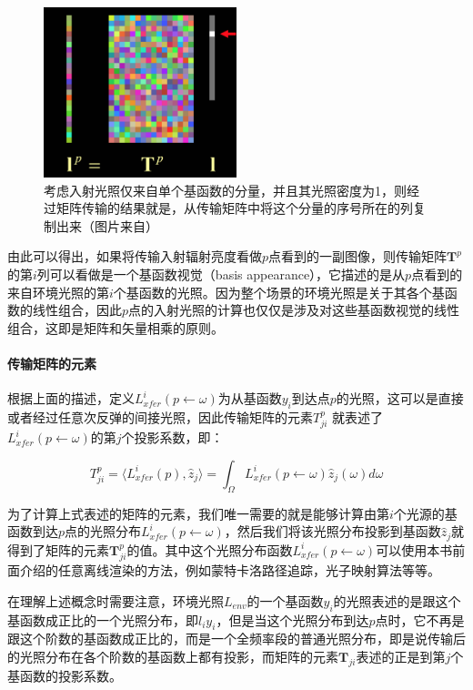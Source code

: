 \begin{figure}
\sidecaption
	\includegraphics[width=0.5\textwidth]{figures/prt/prt-11}
	\caption{考虑入射光照仅来自单个基函数的分量，并且其光照密度为1，则经过矩阵传输的结果就是，从传输矩阵中将这个分量的序号所在的列复制出来（图片来自\cite{a:PrecomputedRadianceTransfer:TheoryandPractice}）}
	\label{f:pl-matrix}
\end{figure}

由此可以得出，如果将传输入射辐射亮度看做$p$点看到的一副图像，则传输矩阵$\mathbf{T}^{p}$的第$i$列可以看做是一个基函数视觉（basis appearance），它描述的是从$p$点看到的来自环境光照的第$i$个基函数的光照。因为整个场景的环境光照是关于其各个基函数的线性组合，因此$p$点的入射光照的计算也仅仅是涉及对这些基函数视觉的线性组合，这即是矩阵和矢量相乘的原则。



\paragraph{传输矩阵的元素}
根据上面的描述，定义$L^{i}_{xfer}(p\leftarrow\omega)$为从基函数$y_i$到达点$p$的光照，这可以是直接或者经过任意次反弹的间接光照，因此传输矩阵的元素$T^{p}_{ji}$ 就表述了$L^{i}_{xfer}(p\leftarrow\omega)$的第$j$个投影系数，即：

\begin{equation}
	T^{p}_{ji}=\langle L^{i}_{xfer}(p),\hat{z}_j\rangle =\int_\Omega L^{i}_{xfer}(p\leftarrow\omega)\hat{z}_j(\omega)d\omega
\end{equation}

为了计算上式表述的矩阵的元素，我们唯一需要的就是能够计算由第$i$个光源的基函数到达$p$点的光照分布$L^{i}_{xfer}(p\leftarrow\omega)$，然后我们将该光照分布投影到基函数$\hat{z}_j$就得到了矩阵的元素$\mathbf{T}^{p}_{ji}$的值。其中这个光照分布函数$L^{i}_{xfer}(p\leftarrow\omega)$可以使用本书前面介绍的任意离线渲染的方法，例如蒙特卡洛路径追踪，光子映射算法等等。

\begin{myshaded}
	在理解上述概念时需要注意，环境光照$L_{env}$的一个基函数$y_i$的光照表述的是跟这个基函数成正比的一个光照分布，即$l_iy_i$，但是当这个光照分布到达$p$点时，它不再是跟这个阶数的基函数成正比的，而是一个全频率段的普通光照分布，即是说传输后的光照分布在各个阶数的基函数上都有投影，而矩阵的元素$\mathbf{T}_{ji}$表述的正是到第$j$个基函数的投影系数。
\end{myshaded}




